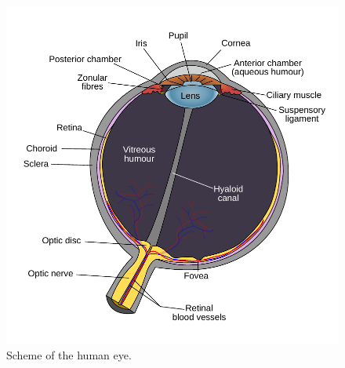 \documentclass{acm_proc_article-sp}
\begin{document}
\begin{figure}
    \centering
    \includegraphics[width=\columnwidth]{human_eye_scheme.pdf}
    \caption{Scheme of the human eye.}
    \label{humaneye}
\end{figure}
\end{document}
